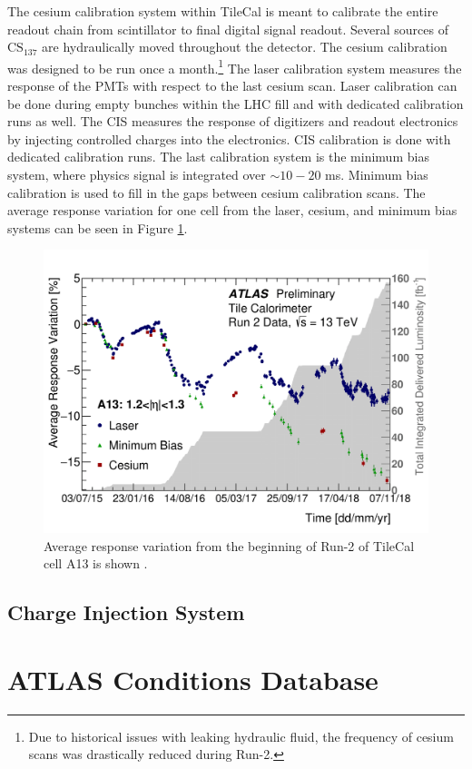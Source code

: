 		The cesium calibration system within \gls{TileCal} is meant to calibrate the entire readout chain from scintillator to final digital signal readout. Several sources of $\mathrm{CS}_{137}$ are hydraulically moved throughout the detector. The cesium calibration was designed to be run once a month.\footnote{Due to historical issues with leaking hydraulic fluid, the frequency of cesium scans was drastically reduced during Run-2.} The laser calibration system measures the response of the \glspl{PMT} with respect to the last cesium scan. Laser calibration can be done during empty bunches within the \gls{LHC} fill and with dedicated calibration runs as well. The \gls{CIS} measures the response of digitizers and readout electronics by injecting controlled charges into the electronics. \gls{CIS} calibration is done with dedicated calibration runs. The last calibration system is the minimum bias system, where physics signal is integrated over $\sim 10 - 20 $ ms. Minimum bias calibration is used to fill in the gaps between cesium calibration scans. The average response variation for one cell from the laser, cesium, and minimum bias systems can be seen in Figure \ref{fig:tile-calib-a13}.

		\begin{figure}
			\centering
			\includegraphics[width=.75\textwidth,keepaspectratio=true]{appendices/images/A13_run2.png}
			\caption{\label{fig:tile-calib-a13} Average response variation from the beginning of Run-2 of \gls{TileCal} cell A13 is shown \cite{Tile-Run2-perf}. }
		\end{figure}

		
		\subsection{Charge Injection System}

	\section{ATLAS Conditions Database}